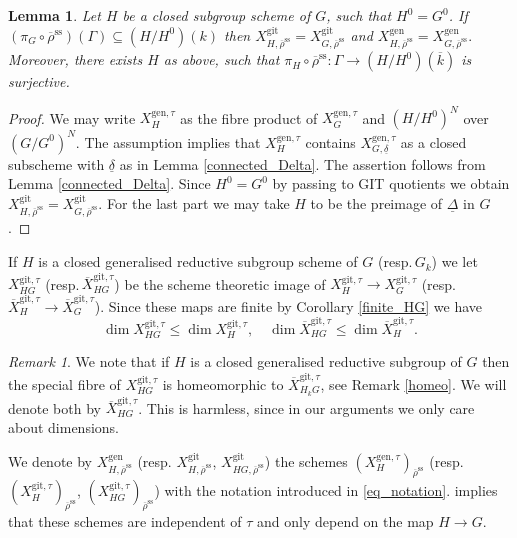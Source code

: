 \documentclass{amsart}
\newtheorem{lem}[prop]{Lemma}
\theoremstyle{definition}
\theoremstyle{remark}
\newtheorem{remar}[prop]{Remark}
\newcommand{\rhobar}{\overline{\rho}}
\newcommand{\gen}{\mathrm{gen}}
\newcommand{\gps}{\mathrm{git}}
\newcommand{\XbargpsHtau}{\overline{X}^{\gps,\tau}_H}
\newcommand{\XgpsGtau}{X^{\gps, \tau}_{G}}
\newcommand{\XgpsHtau}{X^{\gps, \tau}_{H}}
\newcommand{\XbargpsGtau}{\overline{X}^{\gps,\tau}_G}
\newcommand{\kbar}{\overline{k}}
\newcommand{\rhobarss}{\rhobar^{\mathrm{ss}}}
\begin{document}
\begin{lem}\label{shrink} Let $H$ be a closed subgroup scheme of $G$, such that $H^0=G^0$. If 
$(\pi_G\circ\rhobarss)(\Gamma) \subseteq (H/H^0)(k)$ then 
$ X^{\gps}_{H, \rhobarss}= X^{\gps}_{G, \rhobarss}$ and $X^{\gen}_{H, \rhobarss}= X^{\gen}_{G, \rhobarss}.$
Moreover, there exists $H$ as above, such that $\pi_H \circ \rhobarss: \Gamma \rightarrow (H/H^0)(\kbar)$
is surjective. 
\end{lem} 
\begin{proof} We may write $X^{\gen,\tau}_{H}$ as the fibre product of $X^{\gen,\tau}_G$ and $(H/H^0)^N$ 
over $(G/G^0)^N$. The assumption implies that  $X^{\gen,\tau}_{H}$ contains $X^{\gen,\tau}_{G, \underline{\delta}}$ as a closed subscheme with $\underline{\delta}$ as in Lemma \ref{connected_Delta}.
The assertion follows from Lemma \ref{connected_Delta}. Since $H^0=G^0$ by passing to GIT quotients 
we obtain $X^{\gps}_{H, \rhobarss}=X^{\gps}_{G, \rhobarss}$. For the last part 
we may take $H$ to be the preimage of $\underline{\Delta}$ in $G$. 
\end{proof}
 
If $H$ is a closed generalised reductive subgroup scheme of $G$ (resp.\,$G_k$) we let $X^{\gps,\tau}_{HG}$ (resp.\,$\overline{X}^{\gps,\tau}_{HG}$) be the scheme theoretic image of 
$\XgpsHtau\rightarrow \XgpsGtau$ (resp.\,$\XbargpsHtau \rightarrow \XbargpsGtau$). Since these maps are 
finite by Corollary \ref{finite_HG} we have 
\begin{equation}\label{inductive_bound} 
\dim X^{\gps,\tau}_{HG} \le \dim \XgpsHtau, \quad \dim \overline{X}^{\gps,\tau}_{HG} \le \dim \XbargpsHtau. 
\end{equation}

\begin{remar}\label{remar_XgittauHG_bar}
    We note that if $H$ is a closed generalised reductive subgroup of $G$ then the special fibre of $X^{\gps,\tau}_{HG}$ is homeomorphic to $\overline{X}^{\gps,\tau}_{H_kG}$, see Remark \ref{homeo}. We will denote both by $\overline{X}^{\gps,\tau}_{HG}$. This is harmless, since in our arguments we only care about dimensions.
\end{remar}

We denote by $X^{\gen}_{H, \rhobarss}$ (resp. $X^{\gps}_{H, \rhobarss}$, $X^{\gps}_{HG, \rhobarss}$) the schemes $(X^{\gen, \tau}_H)_{\rhobarss}$ (resp. $(X^{\gps, \tau}_H)_{\rhobarss}$, $(X^{\gps, \tau}_{HG})_{\rhobarss}$) with the notation introduced in \eqref{eq_notation}.
  implies that these schemes are independent of $\tau$ and only depend on the map $H \to G$.
\end{document}
